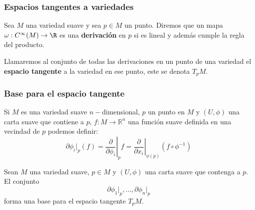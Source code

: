 \begin{frame}
	\frametitle{Espacios tangentes a variedades}
	\begin{definition}
		Sea $M$ una variedad suave y sea $p \in M$ un punto. Diremos que un mapa $\omega: C^{\infty}(M) \to \R$ es una \textbf{derivación} en $p$ si es lineal y además cumple la regla del producto.

		Llamaremos al conjunto de todas las derivaciones en un punto de una variedad el \textbf{espacio tangente} a la variedad en ese punto, este se denota $T_{p}M$.
	\end{definition}
\end{frame}

\begin{frame}
	\frametitle{Base para el espacio tangente}
	Si $M$ es una variedad suave $n-$dimensional, $p$ un punto en $M$ y $(U,\phi)$ una carta suave que contiene a $p$, $f: M \to \mathbb{R}^{n}$ una función suave definida en una vecindad de $p$ podemos definir:
	\[
		\partial \phi_{i} \big|_{p} (f)= 
		\left. \frac{\partial}{\partial \phi_{i}} \right|_{p} f
		= \left. \frac{\partial}{\partial x_{i}} \right|_{\phi(p)} (f \circ \phi^{-1})
	\]\pause

	\begin{theorem}
		Sean $M$ una variedad suave, $p \in M$ y $(U,\phi)$ una carta suave que contenga a $p$. El conjunto
		\[
			\partial \phi_{1} \big|_{p},
			\ldots,
			\partial \phi_{n} \big|_{p}
		\]
		forma una base para el espacio tangente $T_{p}M$.
	\end{theorem}

\end{frame}
